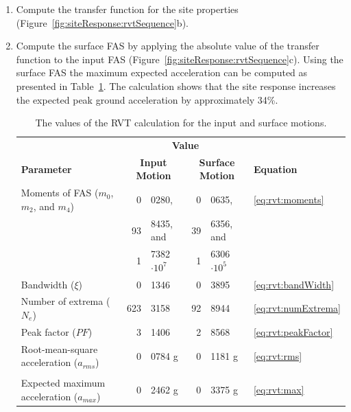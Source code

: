 \documentclass[12pt,oneside]{book}
\begin{document}
\begin{enumerate}
    \item Compute the transfer function for the site properties
        (Figure~\ref{fig:siteResponse:rvtSequence}b).
    \item Compute the surface FAS by applying the absolute value of the transfer function to the input
        FAS (Figure~\ref{fig:siteResponse:rvtSequence}c).  Using the surface FAS the maximum expected
        acceleration can be computed as presented in Table~\ref{tab:rvtSequence:surface}.  The
        calculation shows that the site response increases the expected peak ground acceleration by
        approximately 34\%.

        \begin{table}
            \centering
            \begin{tabular}{l r @{.} l  r @{.} l l}
                \hline\hline
                & \multicolumn{4}{c}{\textbf{Value}}  \\
                \textbf{Parameter} & \multicolumn{2}{c}{\textbf{Input Motion}} &
                \multicolumn{2}{c}{\textbf{Surface Motion}} & \textbf{Equation} \\
                \hline
                Moments of FAS ($m_0$, $m_2$, and $m_4$) & 0&0280, & 0&0635, & \ref{eq:rvt:moments} \\
                                                         & 93&8435, and & 39&6356, and \\
                                                         & 1&7382 $\cdot 10^7$ & 1&6306 $\cdot 10^5$  \\
                Bandwidth ($\xi$) & 0&1346 & 0&3895 & \ref{eq:rvt:bandWidth} \\
                Number of extrema ($N_e$) & 623&3158 & 92&8944 & \ref{eq:rvt:numExtrema} \\
                Peak factor ($PF$) & 3&1406 & 2&8568 & \ref{eq:rvt:peakFactor} \\
                Root-mean-square acceleration ($a_{rms}$) & 0&0784 g & 0&1181 g & \ref{eq:rvt:rms} \\
                \\
                Expected maximum acceleration ($a_{max}$) & 0&2462 g & 0&3375 g & \ref{eq:rvt:max} \\
                \hline\hline
            \end{tabular}
            \caption{The values of the RVT calculation for the input and surface motions.}
            \label{tab:rvtSequence:surface}
        \end{table}

\end{enumerate}
\end{document}
